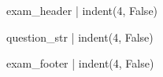 \documentclass[12pt,a4paper,notitlepage]{article}
\begin{document}
    {{ exam_header | indent(4, False) }}

    {{ question_str | indent(4, False) }}

    {{ exam_footer | indent(4, False) }}
\end{document}
